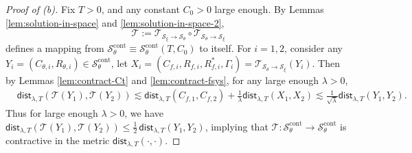 \documentclass[11pt,letterpaper,reqno]{amsart}
\theoremstyle{definition}
\def\cS{\mathcal{S}}
\def\trsfrm{\mathcal{T}}
\def\trsfrmA{\mathcal{T}_{\mathcal{S}_\xi \to {\mathcal{S}}_\theta}}
\def\trsfrmB{\mathcal{T}_{{\mathcal{S}}_\theta \to \mathcal{S}_\xi}}
\newcommand{\lbddst}[2]{\mathsf{dist}_{\lambda,T}(#1,#2)}
\begin{document}
\begin{proof}[Proof of (b)]
Fix $T>0$, and any constant $C_0>0$ large enough.
By Lemmas \ref{lem:solution-in-space} and \ref{lem:solution-in-space-2},
\[\trsfrm:=\trsfrmA \circ \trsfrmB\]
defines a mapping from $\cS_\theta^\text{cont} \equiv
\cS_\theta^\text{cont}(T,C_0)$ to itself. For $i=1,2$, consider any
$Y_i=(C_{\theta,i},R_{\theta,i}) \in {\mathcal{S}}_\theta^\text{cont}$,
let $X_i=(C_{f,i},R_{f,i},R_{f,i}^*,\Gamma_i)=\trsfrmB(Y_i)$.
Then by Lemmas \ref{lem:contract-Ct} and \ref{lem:contract-fsys},
for any large enough $\lambda>0$,
\begin{align}\label{eq:T-contraction}
    &\lbddst{\trsfrm(Y_1)}{\trsfrm(Y_2)}
\lesssim 
\lbddst{C_{f,1}}{C_{f,2}}+\frac{1}{\lambda}\lbddst{X_1}{X_2}
\lesssim \frac{1}{\sqrt{\lambda}}\lbddst{Y_1}{Y_2}.
\end{align}
Thus for large enough $\lambda>0$, we have
$\lbddst{\trsfrm(Y_1)}{\trsfrm(Y_2)} \leq \frac{1}{2}\,\lbddst{Y_1}{Y_2}$,
implying that $\trsfrm:\cS_\theta^\text{cont} \to \cS_\theta^\text{cont}$
is contractive in the metric $\lbddst{\cdot}{\cdot}$.


\end{proof}
\end{document}
